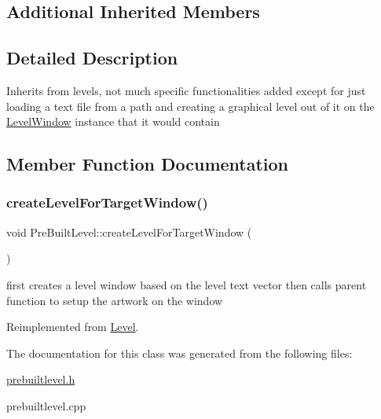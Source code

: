 \subsection*{Additional Inherited Members}


\subsection{Detailed Description}
Inherits from levels, not much specific functionalities added except for just loading a text file from a path and creating a graphical level out of it on the \hyperlink{class_level_window}{Level\+Window} instance that it would contain 

\subsection{Member Function Documentation}
\hypertarget{class_pre_built_level_ac55f77e0ee464325cdd3ffa91292b0c8}{}\label{class_pre_built_level_ac55f77e0ee464325cdd3ffa91292b0c8} 
\subsubsection{\texorpdfstring{create\+Level\+For\+Target\+Window()}{createLevelForTargetWindow()}}
{\footnotesize\ttfamily void Pre\+Built\+Level\+::create\+Level\+For\+Target\+Window (\begin{DoxyParamCaption}{ }\end{DoxyParamCaption})\hspace{0.3cm}{\ttfamily [virtual]}}

first creates a level window based on the level text vector then calls parent function to setup the artwork on the window 

Reimplemented from \hyperlink{class_level_abe1e2e7c89fef892c4620d1a41e5ac22}{Level}.



The documentation for this class was generated from the following files\+:\begin{DoxyCompactItemize}
\item 
\hyperlink{prebuiltlevel_8h}{prebuiltlevel.\+h}\item 
prebuiltlevel.\+cpp\end{DoxyCompactItemize}
